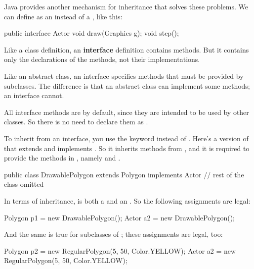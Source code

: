 
Java provides another mechanism for inheritance that solves these problems.
We can define  as an  instead of a , like this:

\begin{code}
public interface Actor {
    void draw(Graphics g);
    void step();
}
\end{code}


Like a class definition, an {\bf interface} definition contains methods.
But it contains only the declarations of the methods, not their implementations.

Like an abstract class, an interface specifies methods that must be provided by subclasses.
The difference is that an abstract class can implement some methods; an interface cannot.

All interface methods are  by default, since they are intended to be used by other classes.
So there is no need to declare them as .

To inherit from an interface, you use the keyword  instead of .
Here's a version of  that extends  and implements .
So it inherits methods from , and it is required to provide the methods in , namely  and .

\begin{code}
public class DrawablePolygon extends Polygon implements Actor {
    // rest of the class omitted
}
\end{code}

In terms of inheritance,  is both a  and an .
So the following assignments are legal:

\begin{code}
Polygon p1 = new DrawablePolygon();
Actor a2 = new DrawablePolygon();
\end{code}

And the same is true for subclasses of ; these assignments are legal, too:

\begin{code}
Polygon p2 = new RegularPolygon(5, 50, Color.YELLOW);
Actor a2 = new RegularPolygon(5, 50, Color.YELLOW);
\end{code}


